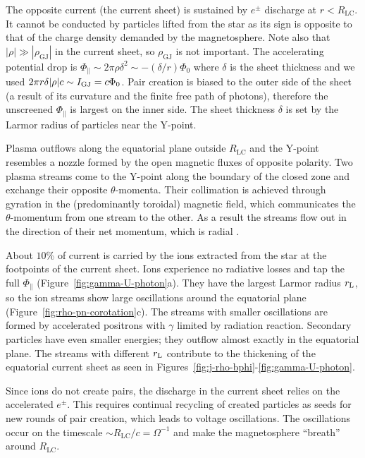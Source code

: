 The opposite current (the current sheet) is sustained by $e^\pm$ discharge
at $r<R_\mathrm{LC}$.
It cannot be conducted by particles lifted
from the star as its sign is opposite to that of the
charge density demanded by the magnetosphere. Note also that
$|\rho|\gg|\rho_\mathrm{GJ}|$ in the current sheet, so $\rho_\mathrm{GJ}$
is not important. The accelerating potential drop
is $\Phi_\parallel\sim 2\pi \rho\delta^2 \sim -(\delta/r)\Phi_0$ where $\delta$ is the
sheet thickness and we used $2\pi  r\delta |\rho| c\sim I_\mathrm{GJ}=c\Phi_0$.
Pair creation is biased to the outer side of the sheet (a result of its curvature
and the finite free path of photons), therefore the unscreened $\Phi_\parallel$ is largest
on the inner side. The sheet thickness $\delta$ is set by the Larmor radius of particles
near the Y-point.

Plasma outflows along the equatorial plane outside $R_\mathrm{LC}$
and the Y-point resembles a nozzle formed by the open magnetic fluxes of opposite
polarity. Two plasma streams come to the Y-point along the boundary of the closed
zone and exchange their opposite $\theta$-momenta.
Their collimation is achieved through gyration in the (predominantly toroidal)
magnetic field, which communicates the $\theta$-momentum from one stream to the other.
As a result the streams flow out in the direction of their net momentum, which is radial
\citep[see also][]{shibata_self-consistent_1985}.

About $10$\% of current is carried by the ions
extracted from the star at the footpoints of the current sheet.
Ions experience no radiative losses and tap the full $\Phi_\parallel$
(Figure~\ref{fig:gamma-U-photon}a). They have the largest Larmor radius
$r_{\rm L}$, so the ion streams show large oscillations around the equatorial plane
(Figure~\ref{fig:rho-pn-corotation}c). The streams with smaller oscillations are formed by
accelerated positrons with $\gamma$ limited by radiation reaction.
Secondary particles have
even smaller energies; they outflow almost exactly in the equatorial plane.
The streams with different $r_{\rm L}$ contribute to the thickening of the equatorial
current sheet as seen in Figures~\ref{fig:j-rho-bphi}-\ref{fig:gamma-U-photon}.


Since ions do not create pairs, the discharge in the current sheet
relies on the accelerated $e^\pm$. This requires continual recycling
of created particles as seeds for new rounds of pair creation, which
leads to voltage oscillations.
The oscillations occur on the timescale $\sim R_\mathrm{LC}/c=\Omega^{-1}$ and make the
magnetosphere ``breath'' around $R_\mathrm{LC}$.

